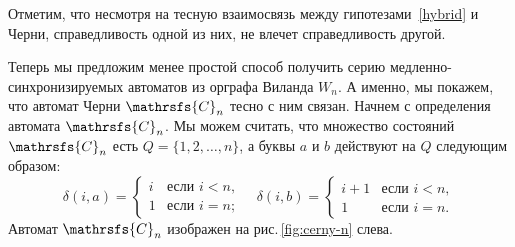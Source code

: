 \documentclass[11pt]{article}
\begin{document}
Отметим, что несмотря на тесную взаимосвязь между гипотезами~\ref{hybrid} и Черни,
справедливость одной из них, не влечет справедливость другой.



Теперь мы предложим менее простой способ получить серию медленно-синхронизируемых
автоматов из орграфа Виланда $W_n$. А именно, мы покажем, что автомат 
Черни $\mathrsfs{C}_n$ тесно с ним связан. Начнем с определения автомата $\mathrsfs{C}_n$. 
Мы можем считать, что множество состояний $\mathrsfs{C}_n$ есть $Q=\{1,2,\dots,n\}$,
а буквы $a$ и $b$ действуют на $Q$ следующим образом:
$$\delta(i,a)=\begin{cases}
i &\text{если } i<n,\\
1 &\text{если } i=n;
\end{cases}\quad
\delta(i,b)=\begin{cases}
i+1 &\text{если } i<n,\\
1 &\text{если } i=n.
\end{cases}$$
Автомат $\mathrsfs{C}_n$ изображен на рис.\,\ref{fig:cerny-n} слева.



\end{document}
